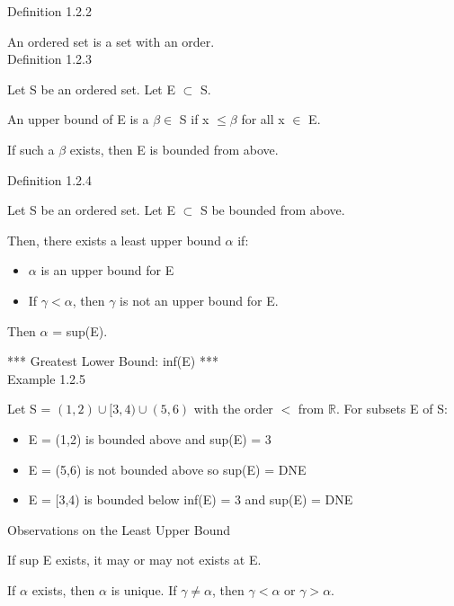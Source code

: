 { \color{blue} Definition 1.2.2 }

\qquad An ordered set is a set with an order. \\

{ \color{blue} Definition 1.2.3 }

\qquad Let S be an ordered set. Let E $ \subset $ S.

\qquad An upper bound of E is a $ \beta \in $ S if x $ \leq \beta $ for all x $ \in $ E.

\qquad If such a $ \beta $ exists, then E is bounded from above. \\

\newpage

{ \color{blue} Definition 1.2.4 }

\qquad Let S be an ordered set. Let E $ \subset $ S be bounded from above.

\qquad Then, there exists a least upper bound $ \alpha $ if:

\begin{itemize}[leftmargin=2cm]
	\item $ \alpha $ is an upper bound for E
	\item If $ \gamma < \alpha $, then $ \gamma $ is not an upper bound for E.
\end{itemize}

\qquad Then $ \alpha $ = sup(E).

*** Greatest Lower Bound: inf(E) *** \\

{ \color{purple} Example 1.2.5 }

\qquad Let S = $ (1,2) \cup [3,4) \cup (5,6) $ with the order $ < $ from $ \mathbb{R} $.
For subsets E of S:

\begin{itemize}[leftmargin=2cm]
	\item E = (1,2) is bounded above and sup(E) = 3
	\item E = (5,6) is not bounded above so sup(E) = DNE
	\item E = [3,4) is bounded below inf(E) = 3 and sup(E) = DNE
\end{itemize}

{ \color{green} Observations on the Least Upper Bound }

\qquad If sup E exists, it may or may not exists at E.

\qquad If $ \alpha $ exists, then $ \alpha $ is unique.
If $ \gamma \neq \alpha $, then $ \gamma < \alpha $ or $ \gamma > \alpha $. \\





